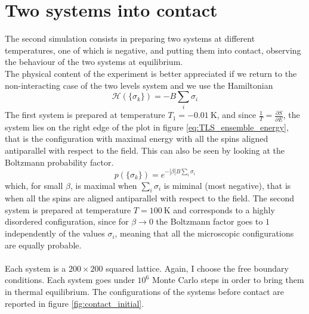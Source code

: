 \section{Two systems into contact}
The second simulation consists in preparing two systems at different temperatures, one of which is negative, and putting them into contact, observing the behaviour of the two systems at equilibrium. \\
The physical content of the experiment is better appreciated if we return to the non-interacting case of the two levels system and we use the Hamiltonian
\begin{equation*}
    \mathcal{H}(\{\sigma_k\}) = -B \sum_i \sigma_i
\end{equation*}
The first system is prepared at temperature $T_1 = \SI{-0.01}{\kelvin}$, and since $\frac{1}{T} = \frac{\partial S}{\partial E}$, the system lies on the right edge of the plot in figure \ref{eq:TLS_ensemble_energy}, that is the configuration with maximal energy with all the spins aligned antiparallel with respect to the field. This can 
also be seen by looking at the Boltzmann probability factor.
\begin{equation*}
    p(\{\sigma_k\}) = e^{-|\beta| B \sum_i \sigma_i}
\end{equation*}
which, for small $\beta$, is maximal when $\sum_i \sigma_i$ is miminal (most negative), that is when all the spins are aligned antiparallel with respect to the field.
The second system is prepared at temperature $T=\SI{100}{\kelvin}$ and corresponds to a highly disordered configuration, since for $\beta \to 0$ the Boltzmann factor goes to $1$ independently of the values $\sigma_i$, meaning that all the microscopic configurations are equally probable. \paragraph{}
Each system is a $200 \times 200$ squared lattice. Again, I choose the free boundary conditions. Each system goes under $10^6$ Monte Carlo steps in order to bring them in thermal equilibrium. The configurations of the systems before contact are reported in figure \ref{fig:contact_initial}. \par
